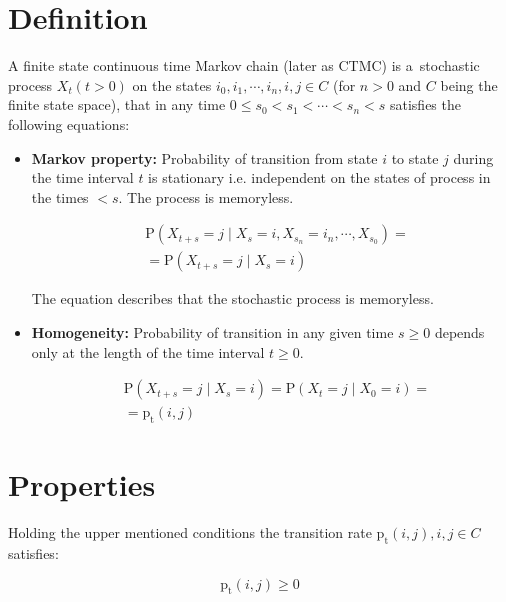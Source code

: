 \documentclass[thesis=M,english]{FITthesis}[2012/10/20]
\begin{document}
\section{Definition}
A finite state continuous time Markov chain (later as CTMC) is a~stochastic process $X_t (t > 0)$ on the states $i_0, i_1, \cdots, i_n, i, j \in C$ (for $n>0$ and $C$ being the finite state space), that in any time $0 \leq s_0 < s_1 < \cdots < s_n < s$ satisfies the following equations: 
\begin{itemize}
\item \textbf{Markov property:} Probability of transition from state $i$ to state $j$ during the time interval $t$ is stationary i.e. independent on the states of process in the times $< s$. The process is memoryless.    
    
\begin{equation}
\begin{aligned}
& \mathrm{P}( X_{t+s} = j \mid X_s = i, X_{s_n} = i_n, \cdots , X_{s_0} ) = \\ 
& = \mathrm{P}( X_{t+s} = j \mid X_s = i )
\end{aligned}
\end{equation}

The equation describes that the stochastic process is memoryless.

\item \textbf{Homogeneity:} Probability of transition in any given time $s \geq 0$ depends only at the length of the time interval $t \geq 0$. 

\begin{equation}
\begin{aligned}
& \mathrm{P}( X_{t+s} = j \mid X_s = i ) = \mathrm{P}( X_t = j \mid X_0 = i ) = \\
& = \mathrm{p_t}(i,j)
\end{aligned}
\end{equation}

\end{itemize}

\section{Properties} 

Holding the upper mentioned conditions the transition rate $\mathrm{p_t}(i,j), i,j \in C$ satisfies:%


\begin{equation}
\mathrm{p_t}(i,j) \geq 0
\end{equation}
\end{document}
